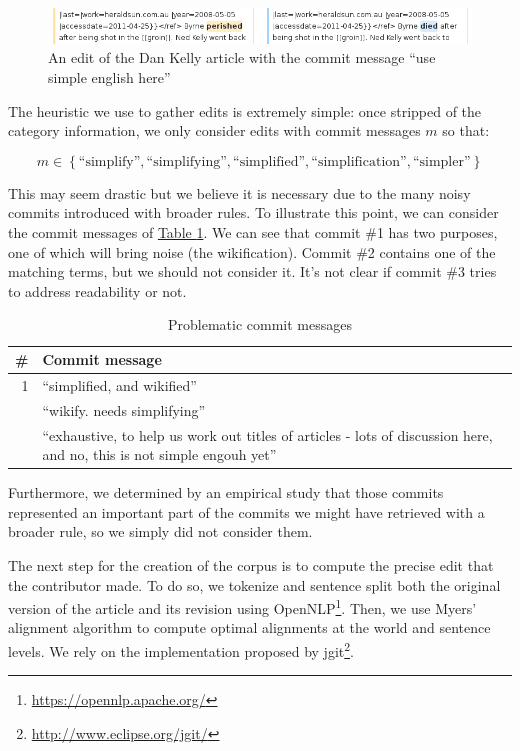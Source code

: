 \documentclass[a4paper, 11pt, onepage]{scrreprt}
\newcommand\tableref[1]{\hyperref[#1]{Table \ref*{#1}}}
\begin{document}
\begin{figure}[H]
  \centering
  \includegraphics[width=\textwidth]{dan-kelly}
  \caption{An edit of the Dan Kelly article with the commit message
    “use simple english here”}
  \label{fig:dan-kelly}
\end{figure}

The heuristic we use to gather edits is extremely simple: once
stripped of the category information, we only consider edits with
commit messages $m$ so that:

\[
m \in \left\{\text{“simplify”}, \text{“simplifying”},
  \text{“simplified”}, \text{“simplification”},
  \text{“simpler”}\right\}
\]

This may seem drastic but we believe it is necessary due to the many
noisy commits introduced with broader rules. To illustrate this point,
we can consider the commit messages of
\tableref{tab:problematic-commits}. We can see that commit \#1 has two
purposes, one of which will bring noise (the wikification). Commit \#2
contains one of the matching terms, but we should not consider
it. It's not clear if commit \#3 tries to address readability or not.

\begin{table}[H]
  \centering
  \caption{Problematic commit messages}
  \begin{tabular}{rp{12cm}}
    \toprule
    \# & Commit message \\
    \midrule
    1 & “simplified, and wikified” \\
    \addlinespace
    2 & “wikify. needs simplifying” \\
    \addlinespace
    3 & “exhaustive, to help us work out titles of articles - lots of
    discussion here, and no, this is not simple engouh yet” \\
  \end{tabular}
  \label{tab:problematic-commits}
\end{table}

Furthermore, we determined by an empirical study that those commits
represented an important part of the commits we might have retrieved
with a broader rule, so we simply did not consider them.

The next step for the creation of the corpus is to compute the precise
edit that the contributor made. To do so, we tokenize and sentence
split both the original version of the article and its revision using
OpenNLP\footnote{\url{https://opennlp.apache.org/}}. Then, we use
Myers' alignment algorithm \cite{myers1988optimal} to compute optimal
alignments at the world and sentence levels. We rely on the
implementation proposed by
jgit\footnote{\url{http://www.eclipse.org/jgit/}}.
\end{document}
